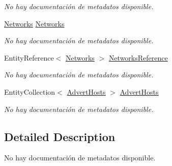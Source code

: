 \begin{DoxyCompactItemize}
\begin{DoxyCompactList}\small\item\em No hay documentación de metadatos disponible. \end{DoxyCompactList}\item 
\hyperlink{class_microsoft_1_1_samples_1_1_kinect_1_1_basic_interactions_1_1_networks}{Networks} \hyperlink{class_microsoft_1_1_samples_1_1_kinect_1_1_basic_interactions_1_1_advert_campaigns_a7714cf733fad4856127b5a6ff13e6a27}{Networks}
\begin{DoxyCompactList}\small\item\em No hay documentación de metadatos disponible. \end{DoxyCompactList}\item 
Entity\-Reference$<$ \hyperlink{class_microsoft_1_1_samples_1_1_kinect_1_1_basic_interactions_1_1_networks}{Networks} $>$ \hyperlink{class_microsoft_1_1_samples_1_1_kinect_1_1_basic_interactions_1_1_advert_campaigns_ad9881e95e1948319c19bb91ec7ecd1d1}{Networks\-Reference}
\begin{DoxyCompactList}\small\item\em No hay documentación de metadatos disponible. \end{DoxyCompactList}\item 
Entity\-Collection$<$ \hyperlink{class_microsoft_1_1_samples_1_1_kinect_1_1_basic_interactions_1_1_advert_hosts}{Advert\-Hosts} $>$ \hyperlink{class_microsoft_1_1_samples_1_1_kinect_1_1_basic_interactions_1_1_advert_campaigns_af69cf733cf62c503cf7bf8c03c96a185}{Advert\-Hosts}
\begin{DoxyCompactList}\small\item\em No hay documentación de metadatos disponible. \end{DoxyCompactList}\end{DoxyCompactItemize}


\subsection{Detailed Description}
No hay documentación de metadatos disponible. 



